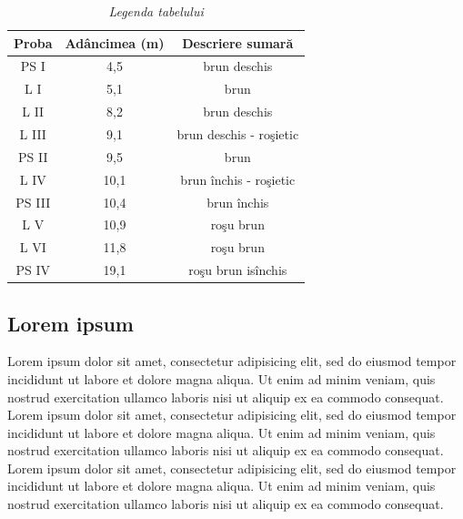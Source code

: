 \documentclass[12pt,openright,twoside]{book}
\begin{document}
\begin{table}[b]
\centering
\begin{small}
{\caption{\textit{Legenda tabelului}}}
\begin{tabular}{ccc}

\hline\hline
Proba & Ad\^ancimea (m) & Descriere sumar\u{a}      \\
\hline
PS I        & 4,5              & brun deschis   \\
L I         & 5,1              & brun           \\
L II        & 8,2              & brun deschis   \\
L III       & 9,1              & brun deschis  -  ro\c{s}ietic  \\
PS II           & 9,5              & brun         \\
L IV        & 10,1             & brun \^inchis - ro\c{s}ietic   \\
PS III      & 10,4             & brun \^inchis  \\
L V         & 10,9             & ro\c{s}u brun  \\
L VI        & 11,8             & ro\c{s}u brun  \\
PS IV       & 19,1             & ro\c{s}u brun  is\^inchis          \\
\hline
\end{tabular}
\end{small}
\end{table}




\subsection{Lorem ipsum }

Lorem ipsum dolor sit amet, consectetur adipisicing elit, sed do eiusmod tempor incididunt ut labore et dolore magna aliqua. Ut enim ad minim veniam, quis nostrud exercitation ullamco laboris nisi ut aliquip ex ea commodo consequat.\\

Lorem ipsum dolor sit amet, consectetur adipisicing elit, sed do eiusmod tempor incididunt ut labore et dolore magna aliqua. Ut enim ad minim veniam, quis nostrud exercitation ullamco laboris nisi ut aliquip ex ea commodo consequat.\\

Lorem ipsum dolor sit amet, consectetur adipisicing elit, sed do eiusmod tempor incididunt ut labore et dolore magna aliqua. Ut enim ad minim veniam, quis nostrud exercitation ullamco laboris nisi ut aliquip ex ea commodo consequat.\\
\end{document}
